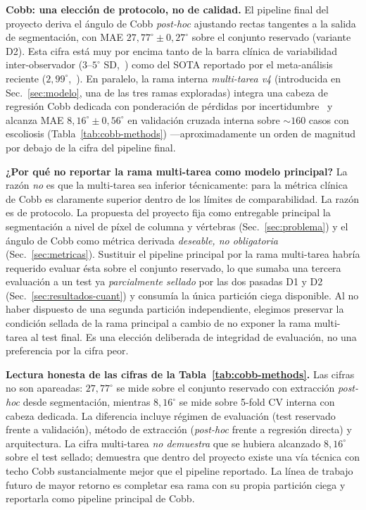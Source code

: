 \documentclass[conference]{IEEEtran}
\begin{document}
\textbf{Cobb: una elección de protocolo, no de calidad.} El pipeline final del proyecto deriva el ángulo de Cobb \emph{post-hoc} ajustando rectas tangentes a la salida de segmentación, con MAE $27{,}77^{\circ} \pm 0{,}27^{\circ}$ sobre el conjunto reservado (variante D2). Esta cifra está muy por encima tanto de la barra clínica de variabilidad inter-observador ($3$--$5^{\circ}$ SD,~\cite{cobb_interrater}) como del SOTA reportado por el meta-análisis reciente ($2{,}99^{\circ}$,~\cite{meta_cobb}). En paralelo, la rama interna \emph{multi-tarea v4} (introducida en Sec.~\ref{sec:modelo}, una de las tres ramas exploradas) integra una cabeza de regresión Cobb dedicada con ponderación de pérdidas por incertidumbre~\cite{kendall_uncertainty} y alcanza MAE $8{,}16^{\circ} \pm 0{,}56^{\circ}$ en validación cruzada interna sobre $\sim 160$ casos con escoliosis (Tabla~\ref{tab:cobb-methods}) ---aproximadamente un orden de magnitud por debajo de la cifra del pipeline final.

\textbf{¿Por qué no reportar la rama multi-tarea como modelo principal?} La razón \emph{no} es que la multi-tarea sea inferior técnicamente: para la métrica clínica de Cobb es claramente superior dentro de los límites de comparabilidad. La razón es de protocolo. La propuesta del proyecto fija como entregable principal la segmentación a nivel de píxel de columna y vértebras (Sec.~\ref{sec:problema}) y el ángulo de Cobb como métrica derivada \emph{deseable, no obligatoria} (Sec.~\ref{sec:metricas}). Sustituir el pipeline principal por la rama multi-tarea habría requerido evaluar ésta sobre el conjunto reservado, lo que sumaba una tercera evaluación a un test ya \emph{parcialmente sellado} por las dos pasadas D1 y D2 (Sec.~\ref{sec:resultados-cuant}) y consumía la única partición ciega disponible. Al no haber dispuesto de una segunda partición independiente, elegimos preservar la condición sellada de la rama principal a cambio de no exponer la rama multi-tarea al test final. Es una elección deliberada de integridad de evaluación, no una preferencia por la cifra peor.

\textbf{Lectura honesta de las cifras de la Tabla~\ref{tab:cobb-methods}.} Las cifras no son apareadas: $27{,}77^{\circ}$ se mide sobre el conjunto reservado con extracción \emph{post-hoc} desde segmentación, mientras $8{,}16^{\circ}$ se mide sobre 5-fold CV interna con cabeza dedicada. La diferencia incluye régimen de evaluación (test reservado frente a validación), método de extracción (\emph{post-hoc} frente a regresión directa) y arquitectura. La cifra multi-tarea \emph{no demuestra} que se hubiera alcanzado $8{,}16^{\circ}$ sobre el test sellado; demuestra que dentro del proyecto existe una vía técnica con techo Cobb sustancialmente mejor que el pipeline reportado. La línea de trabajo futuro de mayor retorno es completar esa rama con su propia partición ciega y reportarla como pipeline principal de Cobb.
\end{document}
